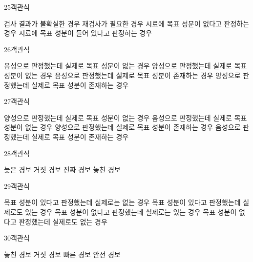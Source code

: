 \documentclass[fs9,seriesRus]{korfarm-base}
\begin{document}
\begin{kfQBlock}{25}{객관식}
\begin{kfChoices}
\kfChoice 검사 결과가 불확실한 경우
\kfChoice 재검사가 필요한 경우
\kfChoice 시료에 목표 성분이 없다고 판정하는 경우
\kfChoice 시료에 목표 성분이 들어 있다고 판정하는 경우
\end{kfChoices}
\end{kfQBlock}
\begin{kfQBlock}{26}{객관식}
\begin{kfChoices}
\kfChoice 음성으로 판정했는데 실제로 목표 성분이 없는 경우
\kfChoice 양성으로 판정했는데 실제로 목표 성분이 없는 경우
\kfChoice 음성으로 판정했는데 실제로 목표 성분이 존재하는 경우
\kfChoice 양성으로 판정했는데 실제로 목표 성분이 존재하는 경우
\end{kfChoices}
\end{kfQBlock}
\begin{kfQBlock}{27}{객관식}
\begin{kfChoices}
\kfChoice 양성으로 판정했는데 실제로 목표 성분이 없는 경우
\kfChoice 음성으로 판정했는데 실제로 목표 성분이 없는 경우
\kfChoice 양성으로 판정했는데 실제로 목표 성분이 존재하는 경우
\kfChoice 음성으로 판정했는데 실제로 목표 성분이 존재하는 경우
\end{kfChoices}
\end{kfQBlock}
\begin{kfQBlock}{28}{객관식}
\begin{kfChoices}
\kfChoice 늦은 경보
\kfChoice 거짓 경보
\kfChoice 진짜 경보
\kfChoice 놓친 경보
\end{kfChoices}
\end{kfQBlock}
\begin{kfQBlock}{29}{객관식}
\begin{kfChoices}
\kfChoice 목표 성분이 있다고 판정했는데 실제로는 없는 경우
\kfChoice 목표 성분이 있다고 판정했는데 실제로도 있는 경우
\kfChoice 목표 성분이 없다고 판정했는데 실제로는 있는 경우
\kfChoice 목표 성분이 없다고 판정했는데 실제로도 없는 경우
\end{kfChoices}
\end{kfQBlock}
\begin{kfQBlock}{30}{객관식}
\begin{kfChoices}
\kfChoice 놓친 경보
\kfChoice 거짓 경보
\kfChoice 빠른 경보
\kfChoice 안전 경보
\end{kfChoices}
\end{kfQBlock}
\end{document}

